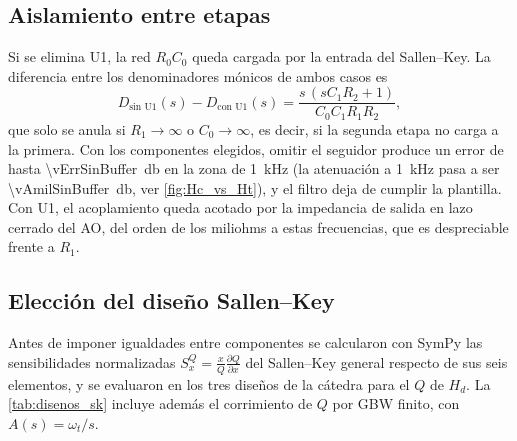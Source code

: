 \subsection{Aislamiento entre etapas}
Si se elimina U1, la red $R_0C_0$ queda cargada por la entrada del Sallen--Key. La diferencia entre los denominadores mónicos de ambos casos es
\begin{equation}
  D_{\text{sin U1}}(s) - D_{\text{con U1}}(s) = \frac{s\,(sC_1R_2+1)}{C_0C_1R_1R_2},
\end{equation}
que solo se anula si $R_1\to\infty$ o $C_0\to\infty$, es decir, si la segunda etapa no carga a la primera. Con los componentes elegidos, omitir el
seguidor produce un error de hasta \qty{\vErrSinBuffer}{\decibel} en la zona de \qty{1}{\kilo\hertz} (la atenuación a \qty{1}{\kilo\hertz} pasa a
ser \qty{\vAmilSinBuffer}{\decibel}, ver \cref{fig:Hc_vs_Ht}), y el filtro deja de cumplir la plantilla. Con U1, el acoplamiento queda acotado por
la impedancia de salida en lazo cerrado del AO, del orden de los miliohms a estas frecuencias, que es despreciable frente a $R_1$.

\subsection{Elección del diseño Sallen--Key}
Antes de imponer igualdades entre componentes se calcularon con SymPy las sensibilidades normalizadas
$S_x^{Q} = \frac{x}{Q}\frac{\partial Q}{\partial x}$ del Sallen--Key general respecto de sus seis elementos, y se evaluaron en los tres diseños de la
cátedra para el $Q$ de $H_d$. La \cref{tab:disenos_sk} incluye además el corrimiento de $Q$ por GBW finito, con $A(s) = \omega_t/s$.

\begin{table}[H]
  \centering
  \caption{Comparación de los diseños Sallen--Key de la cátedra~\cite[tabla~8.1]{daryanani1976} para $Q = \num{\vQD}$.}
  \label{tab:disenos_sk}
\end{table}

